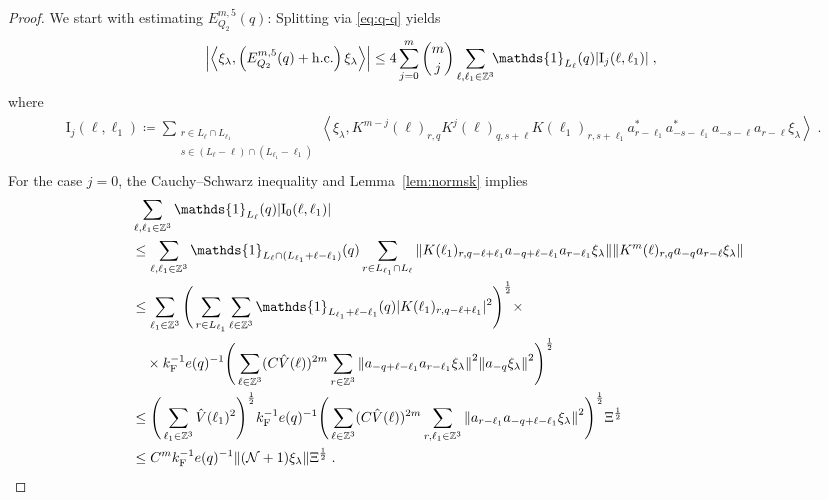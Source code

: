 \documentclass[12pt,a4paper]{article}
\numberwithin{equation}{section}
\newcommand{\1}{\mathbb{I}}
\newcommand{\F}{\mathrm{F}}
\newcommand{\I}{\mathrm{I}}
\newcommand{\kF}{k_\F}
\newcommand{\Zstar}{\mathbb{Z}^3} %
\newcommand{\Z}{\mathbb{Z}}
\newcommand{\NN}{\mathcal{N}}
\newcommand{\half}{\frac{1}{2}}
\newcommand{\eva}[1]{\left\langle #1 \right\rangle}
\theoremstyle{plain}
\theoremstyle{definition}
\theoremstyle{remark}
\theoremstyle{plain}
\theoremstyle{definition}
\theoremstyle{remark}
\begin{document}
\begin{proof}
We start with estimating $ E^{m,5}_{Q_2}(q) $: Splitting via \eqref{eq:q-q} yields
\begin{equation} \label{eq:EQ2131}
\begin{aligned}
	& \abs{\eva{\xi_\lambda,\left(E^{m,5}_{Q_2}(q) +\mathrm{h.c.}\right) \xi_\lambda }}
	\le 4 \sum_{j=0}^m {{m}\choose j} \sum_{\ell,\ell_1  \in \Zstar}\!\! \mathds{1}_{L_\ell}(q) |\I_j(\ell, \ell_1)| \;,
	\end{aligned}
\end{equation}
where
\begin{equation}
\begin{aligned}
	& \I_j(\ell, \ell_1)
	\coloneq \sum_{\substack{r\in L_{\ell} \cap L_{\ell_1}\\ s \in (L_{\ell} - \ell) \cap (L_{\ell_1} - \ell_1)}}
		\eva{\xi_\lambda, K^{m-j}(\ell)_{r,q} K^{j}(\ell)_{q,s+\ell} K(\ell_1)_{r,s+\ell_1} a^*_{r-\ell_1} a^*_{-s-\ell_1} a_{-s-\ell} a_{r-\ell} \xi_\lambda} \;. \\
\end{aligned}
\end{equation}
For the case $ j = 0 $, the Cauchy--Schwarz inequality and Lemma~\ref{lem:normsk} implies
\begin{align}
	&\sum_{\ell,\ell_1 \in \Zstar} \mathds{1}_{L_\ell}(q) |\I_0(\ell, \ell_1)| \nonumber\\
	&\leq \sum_{\ell,\ell_1 \in \Zstar} \mathds{1}_{L_\ell \cap (L_{\ell_1}+\ell-\ell_1)}(q) \sum\limits_{r\in L_{\ell_1} \cap L_\ell}
		\norm{ K(\ell_1)_{r,q-\ell+\ell_1} a_{-q+\ell-\ell_1} a_{r-\ell_1} \xi_\lambda}
		\norm{ K^m(\ell)_{r,q} a_{-q}a_{r-\ell} \xi_\lambda } \nonumber\\
	&\leq \sum_{\ell_1 \in \Zstar}
		\Bigg( \sum_{r\in L_{\ell_1}} \sum_{\ell \in \Z^3} \mathds{1}_{L_{\ell_1}+\ell-\ell_1}(q) |K(\ell_1)_{r,q-\ell+\ell_1}|^2 \Bigg)^{\half} \times \nonumber\\
	&\quad \times \kF^{-1} e(q)^{-1} \Bigg( \sum_{\ell \in \Zstar} (C \hat{V}(\ell))^{2m} \sum_{r\in \Z^3} \norm{a_{-q+\ell-\ell_1} a_{r-\ell_1} \xi_\lambda}^2
		\norm{ a_{-q} \xi_\lambda }^2 \Bigg)^{\half} \nonumber\\
	&\leq \Bigg( \sum_{\ell_1 \in \Zstar} \hat{V}(\ell_1)^2 \Bigg)^{\half} \kF^{-1} e(q)^{-1}
		\Bigg( \sum_{\ell \in \Zstar} (C \hat{V}(\ell))^{2m} \sum_{r,\ell_1 \in \Z^3} \norm{a_{r-\ell_1} a_{-q+\ell-\ell_1} \xi_\lambda}^2 \Bigg)^{\half} \Xi^{\half} \nonumber\\
	&\leq C^m \kF^{-1} e(q)^{-1}
		\norm{ (\NN+1) \xi_\lambda} \Xi^{\half} \;. \label{eq:estEQ2131_Coulomb}

\end{align}
\end{proof}
\end{document}

